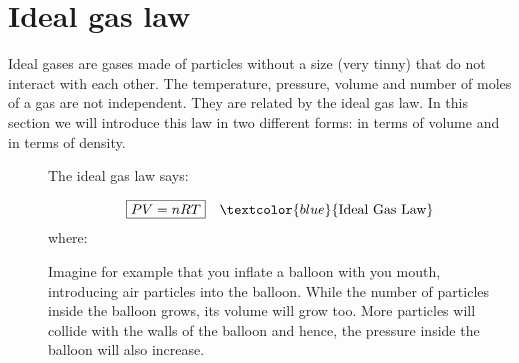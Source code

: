 \documentclass[main.tex]{subfiles}
\begin{document}






\section{Ideal gas law}
Ideal gases are gases made of particles without a size (very tinny) that do not interact with each other. The temperature, pressure, volume and number of moles of a gas are not independent. They are related by the ideal gas law. In this section we will introduce this law in two different forms: in terms of volume and in terms of density.
\sloppy 
\begin{description}
\item[] 
The ideal gas law says:%

\begin{equation*}\begin{split}
\boxed{  PV=nRT} \quad \textcolor{blue}{\text{Ideal Gas Law}}
\end{split}\end{equation*}
where:
Imagine for example that you inflate a balloon with you mouth, introducing air particles into the balloon.
While the number of particles inside the balloon grows, its volume will grow too. More particles will collide with the walls of the balloon and hence, the pressure inside the balloon will also increase. 


\end{description}
\end{document}
